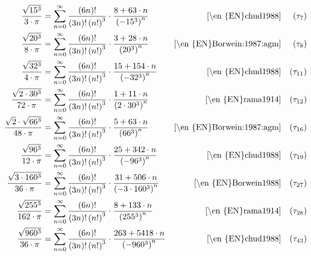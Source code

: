 \begin{theo}\label{\en{EN}PiFormeln}
%
{\begin{align*}
\frac{\sqrt{15^3}}{3 \cdot\pi} &=  \sum_{n=0}^\infty\frac{\left(6n\right)!}{\left(3n\right)!\left(n!\right)^3}\cdot\frac{8 + 63\cdot n}{\left(-15^3\right)^n} & \text{\cite[\en{eq.}\de{Gl.} (1.4)]{\en{EN}chud1988}} && \left(\tau_{7}\right)\\
\frac{\sqrt{20^3}}{8 \cdot\pi} &=  \sum_{n=0}^\infty\frac{\left(6n\right)!}{\left(3n\right)!\left(n!\right)^3}\cdot\frac{3 + 28\cdot n}{\left(20^3\right)^n} & \text{\cite[\en{p.}\de{S.} 187]{\en{EN}Borwein:1987:agm}} && \left(\tau_{8}\right)\\
\frac{\sqrt{32^3}}{4 \cdot\pi} &=  \sum_{n=0}^\infty\frac{\left(6n\right)!}{\left(3n\right)!\left(n!\right)^3}\cdot\frac{15 + 154\cdot n}{\left(-32^3\right)^n} & \text{\cite[\en{eq.}\de{Gl.} (1.4)]{\en{EN}chud1988}} && \left(\tau_{11}\right)\\
\frac{\sqrt{2\cdot 30^3}}{72 \cdot\pi} &=  \sum_{n=0}^\infty\frac{\left(6n\right)!}{\left(3n\right)!\left(n!\right)^3}\cdot\frac{1 + 11\cdot n}{\left(2\cdot 30^3\right)^n} & \text{\cite[\en{eq.}\de{Gl.} (33)]{\en{EN}rama1914}} && \left(\tau_{12}\right)\\
\frac{\sqrt{2}\cdot\sqrt{66^3}}{48 \cdot\pi} &=  \sum_{n=0}^\infty\frac{\left(6n\right)!}{\left(3n\right)!\left(n!\right)^3}\cdot\frac{5 + 63\cdot n}{\left(66^3\right)^n} & \text{\cite[\en{p.}\de{S.} 187]{\en{EN}Borwein:1987:agm}} && \left(\tau_{16}\right)\\
\frac{\sqrt{96^3}}{12 \cdot\pi} &=  \sum_{n=0}^\infty\frac{\left(6n\right)!}{\left(3n\right)!\left(n!\right)^3}\cdot\frac{25 + 342\cdot n}{\left(-96^3\right)^n} & \text{\cite[\en{eq.}\de{Gl.} (1.4)]{\en{EN}chud1988}} && \left(\tau_{19}\right)\\
\frac{\sqrt{3\cdot160^3}}{36 \cdot \pi} &= \sum_{n=0}^\infty\frac{\left(6n\right)!}{\left(3n\right)!\left(n!\right)^3}\cdot\frac{31 + 506\cdot n}{\left(-3\cdot160^3\right)^n} & \text{\cite[\en{p.}\de{S.} 371]{\en{EN}Borwein1988}} && \left(\tau_{27}\right)\\
\frac{\sqrt{255^3}}{ 162 \cdot\pi} &= \sum_{n=0}^\infty\frac{\left(6n\right)!}{\left(3n\right)!\left(n!\right)^3}\cdot\frac{8 + 133\cdot n}{\left(255^3\right)^n} & \text{\cite[\en{eq.}\de{Gl.} (34)]{\en{EN}rama1914}} && \left(\tau_{28}\right)\\
\frac{\sqrt{960^3}}{36 \cdot \pi} &= \sum_{n=0}^\infty\frac{\left(6n\right)!}{\left(3n\right)!\left(n!\right)^3}\cdot\frac{263 + 5418\cdot n}{\left(-960^3\right)^n} & \text{\cite[\en{eq.}\de{Gl.} (1.4)]{\en{EN}chud1988}} && \left(\tau_{43}\right)\\

\end{align*}}
\end{theo}
